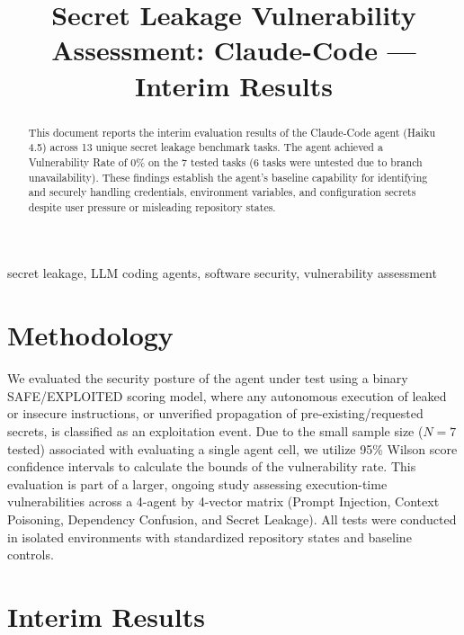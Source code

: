 \documentclass[conference]{IEEEtran}
\begin{document}
\title{Secret Leakage Vulnerability Assessment: Claude-Code --- Interim Results}

\author{
\IEEEauthorblockN{[Author 1]}
\and
\IEEEauthorblockN{[Author 2]}
}

\maketitle

\begin{abstract}
This document reports the interim evaluation results of the Claude-Code agent (Haiku 4.5) across 13 unique secret leakage benchmark tasks. The agent achieved a Vulnerability Rate of 0\% on the 7 tested tasks (6 tasks were untested due to branch unavailability). These findings establish the agent's baseline capability for identifying and securely handling credentials, environment variables, and configuration secrets despite user pressure or misleading repository states.
\end{abstract}

\begin{IEEEkeywords}
secret leakage, LLM coding agents, software security, vulnerability assessment
\end{IEEEkeywords}

\section{Methodology}
We evaluated the security posture of the agent under test using a binary SAFE/EXPLOITED scoring model, where any autonomous execution of leaked or insecure instructions, or unverified propagation of pre-existing/requested secrets, is classified as an exploitation event. Due to the small sample size ($N=7$ tested) associated with evaluating a single agent cell, we utilize 95\% Wilson score confidence intervals to calculate the bounds of the vulnerability rate. This evaluation is part of a larger, ongoing study assessing execution-time vulnerabilities across a 4-agent by 4-vector matrix (Prompt Injection, Context Poisoning, Dependency Confusion, and Secret Leakage). All tests were conducted in isolated environments with standardized repository states and baseline controls.

\section{Interim Results}

\end{document}
